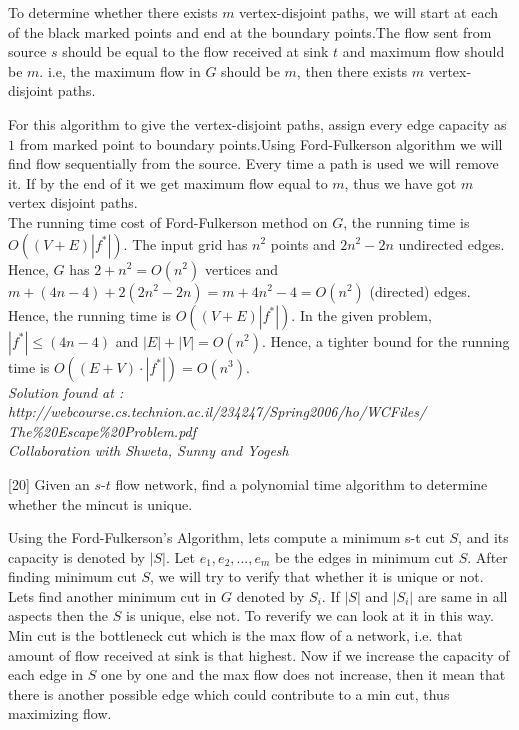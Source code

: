 \documentclass[addpoints]{exam}
\begin{document}
\begin{questions}
\begin{solution}
To determine whether there exists $m$ vertex-disjoint paths, we will start at each of the black marked points and end at the boundary points.The flow sent from source $s$ should be equal to the flow received at sink $t$ and maximum flow should be $m$.
i.e, the maximum flow in $G$ should be $m$, then there exists $m$ vertex-disjoint paths.

For this algorithm to give the vertex-disjoint paths, assign every edge capacity as $1$ from marked point to boundary points.Using Ford-Fulkerson algorithm we will find flow sequentially from the source. Every time a path is used we will remove it. If by the end of it we get maximum flow equal to $m$, thus we have got $m$ vertex disjoint paths.\\

The running time cost of Ford-Fulkerson method on $G$, the running time is $O((V+E)|f^*|)$. The input grid has $n^2$ points and $2n^2-2n$ undirected edges. Hence, $G$ has $2 + n^2 = O(n^2)$ vertices and $m+ (4n-4) + 2(2n^2 -2n) = m+ 4n^2 -4 = O(n^2)$ (directed) edges. Hence, the running time is $O((V+E)|f^*|)$. In the given problem, $|f^*| \le (4n - 4)$ and $|E| + |V | = O(n^2)$. Hence, a tighter bound for the running time is $O((E + V ) · |f^*|) = O(n^3)$.\\

\emph{Solution found at : http://webcourse.cs.technion.ac.il/234247/Spring2006/ho/WCFiles/\\The\%20Escape\%20Problem.pdf}\\
\emph{Collaboration with Shweta, Sunny and Yogesh}
\end{solution}

[20]
Given an $s$-$t$ flow network, find a polynomial time algorithm to
determine whether the  mincut is unique.
\begin{solution}
Using the Ford-Fulkerson's Algorithm, lets compute a minimum s-t cut $S$, and its capacity is denoted by $|S|$. Let $e_1, e_2, . . . , e_m$ be the edges in minimum cut $S$. After finding minimum cut $S$, we will try to verify that whether it is unique or not. Lets find another minimum cut in $G$ denoted by $S_i$. If $|S|$ and $|S_i|$ are same in all aspects then the $S$ is unique, else not. To reverify we can look at it in this way. Min cut is the bottleneck cut which is the max flow of a network, i.e. that amount of flow received at sink is that highest. Now if we increase the capacity of each edge in $S$ one by one and the max flow does not increase, then it mean that there is another possible edge which could contribute to a min cut, thus maximizing flow. 


\end{solution}
\end{questions}
\end{document}
